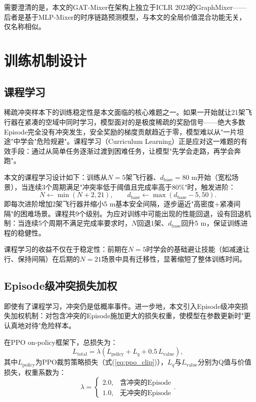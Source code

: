 \documentclass[12pt,a4paper,UTF8]{ctexbook}
\begin{document}
需要澄清的是，本文的GAT-Mixer在架构上独立于ICLR 2023的GraphMixer\cite{ref28}——后者是基于MLP-Mixer的时序链路预测模型，与本文的全局价值混合功能无关，仅名称相似。

\section{训练机制设计}

\subsection{课程学习}

稀疏冲突样本下的训练稳定性是本文面临的核心难题之一。如果一开始就让21架飞行器在紧凑的空域中同时学习，模型面对的是极度稀疏的奖励信号——绝大多数Episode完全没有冲突发生，安全奖励的梯度贡献趋近于零，模型难以从"一片坦途"中学会"危险规避"。课程学习（Curriculum Learning）\cite{ref39}正是应对这一难题的有效手段：通过从简单任务逐渐过渡到困难任务，让模型"先学会走路，再学会奔跑"。

本文的课程学习设计如下：训练从$N=5$架飞行器、$d_{\text{base}}=80$ m开始（宽松场景），当连续3个周期满足"冲突率低于阈值且完成率高于80\%"时，触发进阶：
\begin{equation}
    N \leftarrow \min(N+2, 21), \qquad d_{\text{base}} \leftarrow \max(d_{\text{base}}-5, 50).
    \label{eq:curriculum}
\end{equation}
即每次进阶增加2架飞行器并缩小5 m基本安全间隔，逐步逼近"高密度+紧凑间隔"的困难场景。课程共9个级别。为应对训练中可能出现的性能回退，设有回退机制：当连续5个周期不满足完成率要求时，$N$回退1架、$d_{\text{base}}$回升5 m，保证训练进程的稳健性。

课程学习的收益不仅在于稳定性：前期在$N=5$时学会的基础避让技能（如减速让行、保持间隔）在后期的$N=21$场景中具有迁移性，显著缩短了整体训练时间。

\subsection{Episode级冲突损失加权}

即使有了课程学习，冲突仍是低概率事件。进一步地，本文引入Episode级冲突损失加权机制：对包含冲突的Episode施加更大的损失权重，使模型在参数更新时"更认真地对待"危险样本。

在PPO on-policy框架下，总损失为：
\begin{equation}
    L_{\text{total}} = \lambda\left(L_{\text{policy}} + L_{q} + 0.5\,L_{\text{value}}\right),
    \label{eq:total_loss}
\end{equation}
其中$L_{\text{policy}}$为PPO裁剪策略损失（式(\ref{eq:ppo_clip})），$L_{q}$与$L_{\text{value}}$分别为Q值与价值损失，权重系数为：
\begin{equation}
    \lambda = \begin{cases}
        2.0, & \text{含冲突的Episode}\\
        1.0, & \text{无冲突的Episode}
    \end{cases}.
    \label{eq:lambda}
\end{equation}
\end{document}
